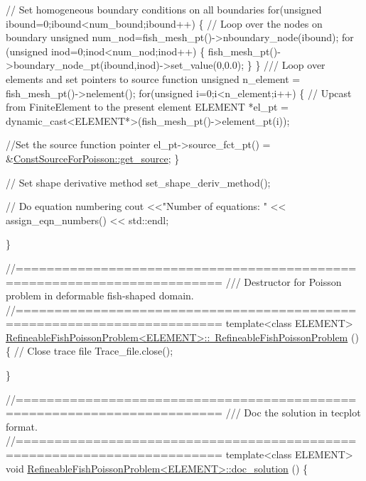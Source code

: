 \begin{DoxyCodeInclude}
{ \textcolor{comment}{// Set homogeneous boundary conditions on all boundaries }
 \textcolor{keywordflow}{for}(\textcolor{keywordtype}{unsigned} ibound=0;ibound<num\_bound;ibound++)
  \{
   \textcolor{comment}{// Loop over the nodes on boundary}
   \textcolor{keywordtype}{unsigned} num\_nod=fish\_mesh\_pt()->nboundary\_node(ibound);
   \textcolor{keywordflow}{for} (\textcolor{keywordtype}{unsigned} inod=0;inod<num\_nod;inod++)
    \{
     fish\_mesh\_pt()->boundary\_node\_pt(ibound,inod)->set\_value(0,0.0);
    \}
  \}
 \textcolor{comment}{}
\textcolor{comment}{ /// Loop over elements and set pointers to source function}
\textcolor{comment}{} \textcolor{keywordtype}{unsigned} n\_element = fish\_mesh\_pt()->nelement();
 \textcolor{keywordflow}{for}(\textcolor{keywordtype}{unsigned} i=0;i<n\_element;i++)
  \{
   \textcolor{comment}{// Upcast from FiniteElement to the present element}
   ELEMENT *el\_pt = \textcolor{keyword}{dynamic\_cast<}ELEMENT*\textcolor{keyword}{>}(fish\_mesh\_pt()->element\_pt(i));
   
   \textcolor{comment}{//Set the source function pointer}
   el\_pt->source\_fct\_pt() = &\hyperlink{namespaceConstSourceForPoisson_a40ef79083874b58ed42b4df2ca0f4c10}{ConstSourceForPoisson::get\_source};
  \}

 \textcolor{comment}{// Set shape derivative method}
 set\_shape\_deriv\_method();

 \textcolor{comment}{// Do equation numbering}
 cout <<\textcolor{stringliteral}{"Number of equations: "} << assign\_eqn\_numbers() << std::endl; 

\}



\textcolor{comment}{//========================================================================}\textcolor{comment}{}
\textcolor{comment}{/// Destructor for Poisson problem in deformable fish-shaped domain.}
\textcolor{comment}{}\textcolor{comment}{//========================================================================}
\textcolor{keyword}{template}<\textcolor{keyword}{class} ELEMENT>
\hyperlink{classRefineableFishPoissonProblem_a7039a3409520850908940927b91af9ab}{RefineableFishPoissonProblem<ELEMENT>::~RefineableFishPoissonProblem}
      ()
\{ 
 \textcolor{comment}{// Close trace file}
 Trace\_file.close();

\}




\textcolor{comment}{//========================================================================}\textcolor{comment}{}
\textcolor{comment}{/// Doc the solution in tecplot format.}
\textcolor{comment}{}\textcolor{comment}{//========================================================================}
\textcolor{keyword}{template}<\textcolor{keyword}{class} ELEMENT>
\textcolor{keywordtype}{void} \hyperlink{classRefineableFishPoissonProblem_a6db25ff0bd3014aa531d9f0e8b385beb}{RefineableFishPoissonProblem<ELEMENT>::doc\_solution}
      ()
\{ 

}
\end{DoxyCodeInclude}

